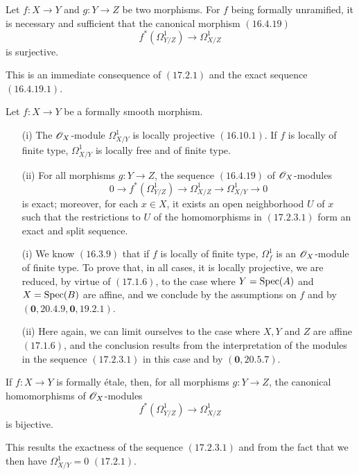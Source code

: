 \begin{corollary}[17.2.2]
\label{IV.17.2.2}
Let $f: X \to Y$ and $g: Y \to Z$ be two morphisms. For $f$ being formally unramified, it is necessary and sufficient that the canonical morphism $(\hyperref[IV.16.4.19]{16.4.19})$
\[
  f^*(\Omega^1_{Y/Z}) \to \Omega^1_{X/Z}
\] is surjective.
\end{corollary}
This is an immediate consequence of $(\hyperref[IV.17.2.1]{17.2.1})$ and the exact sequence $(\hyperref[IV.16.4.19.1]{16.4.19.1})$.

\begin{proposition}[17.2.3]
\label{IV.17.2.3}
Let $f: X \to Y$ be a formally smooth morphism.
\begin{enumerate}
\item[(i)] The $\mathscr{O}_X$-module $\Omega^1 _{X/Y}$ is locally projective $(\hyperref[IV.16.10.1]{16.10.1})$. If $f$ is locally of finite type, $\Omega^1 _{X/Y}$ is locally free and of finite type.
\item[(ii)] For all morphisms $g : Y \to Z$, the sequence $(\hyperref[IV.16.4.19]{16.4.19})$ of $\mathscr{O}_X$-modules
\[
\label{IV.17.2.3.1}
 0 \to f^*(\Omega^1 _{Y/Z}) \to \Omega^1 _{X/Z} \to \Omega^1 _{X/Y} \to 0
\tag{17.2.3.1}
\] is exact; moreover, for each $x \in X$, it exists an open neighborhood $U$ of $x$ such that the restrictions to $U$ of the homomorphisms in $(\hyperref[IV.17.2.3.1]{17.2.3.1})$ form an exact and split sequence.
\end{enumerate}
\end{proposition}
\begin{enumerate}
\item[(i)] We know $(\hyperref[IV.16.3.9]{16.3.9})$ that if $f$ is locally of finite type, $\Omega^1 _f$ is an $\mathscr{O}_X$-module of finite type. To prove that, in all cases, it is locally projective, we are reduced, by virtue of $(\hyperref[IV.17.1.6]{17.1.6})$, to the case where $Y = {\mathop{\mathrm{Spec}}\nolimits}(A)$ and $X = {\mathop{\mathrm{Spec}}\nolimits}(B)$ are affine, and we conclude by the assumptions on $f$ and by $(\textbf{0}, \hyperref[0.20.4.9]{20.4.9}, \textbf{0}, \hyperref[0.19.2.1]{19.2.1})$.
\item[(ii)] Here again, we can limit ourselves to the case where $X, Y$ and $Z$ are affine $(\hyperref[IV.17.1.6]{17.1.6})$, and the conclusion results from the interpretation of the modules in the sequence $(\hyperref[IV.17.2.3.1]{17.2.3.1})$ in this case and by $(\textbf{0}, \hyperref[0.20.5.7]{20.5.7})$.
\end{enumerate}

\begin{corollary}[17.2.4]
\label{IV.17.2.4}
If $f : X \to Y$ is formally \'etale, then, for all morphisms $g : Y \to Z$, the canonical homomorphisms of $\mathscr{O}_X$-modules
\[
  f^*(\Omega^1 _{Y/Z}) \to \Omega^1 _{X/Z}
\] is bijective.
\end{corollary}
This results the exactness of the sequence $(\hyperref[IV.17.2.3.1]{17.2.3.1})$ and from the fact that we then have $\Omega^1 _{X/Y} = 0$ $(\hyperref[IV.17.2.1]{17.2.1})$.

